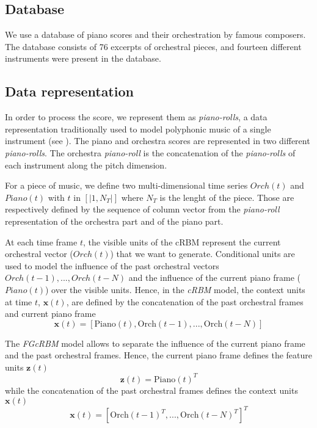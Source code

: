 \documentclass[letterpaper]{article}
\begin{document}
\subsection{Database}
We use a database of piano scores and their orchestration by famous composers. The database consists of 76 excerpts of  orchestral pieces, and fourteen different instruments were present in the database.

\subsection{Data representation}
\label{sec:data_representation}
In order to process the score, we represent them as \textit{piano-rolls}, a data representation traditionally used to model polyphonic music of a single instrument (see ). The piano and orchestra scores are represented in two different \textit{piano-rolls}. The orchestra \textit{piano-roll} is the concatenation of the \textit{piano-rolls} of each instrument along the pitch dimension.

For a piece of music, we define two multi-dimensional time series $Orch(t)$ and $Piano(t)$ with $t$ in $\left[ | 1 , N_{T} | \right]$ where $N_{T}$ is the lenght of the piece. Those are respectively defined by the sequence of column vector from the \textit{piano-roll} representation of the orchestra part and of the piano part.

At each time frame $t$, the visible units of the cRBM represent the current orchestral vector ($Orch(t)$) that we want to generate. Conditional units are used to model the influence of the past orchestral vectors $Orch(t-1) , ... , Orch(t-N)$ and the influence of the current piano frame ($Piano(t)$) over the visible units. Hence, in the \textit{cRBM} model, the context units at time $t$, $\bm{x}(t)$, are defined by the concatenation of the past orchestral frames and current piano frame
\begin{equation}
\bm{x}(t) = \left[ \text{Piano}(t) , \text{Orch}(t-1) , ... , \text{Orch}(t-N)\right]
\end{equation}

The \textit{FGcRBM} model allows to separate the influence of the current piano frame and the past orchestral frames. Hence, the current piano frame defines the feature units $\bm{z}(t)$ 
\begin{equation}
\bm{z}(t) = \text{Piano}(t)^{T}
\end{equation}
while the concatenation of the past orchestral frames defines the context units $\bm{x}(t)$
\begin{equation}
\bm{x}(t) = \left[ \text{Orch}(t-1)^{T} , ... , \text{Orch}(t-N)^{T} \right]^{T}
\end{equation}
\end{document}
